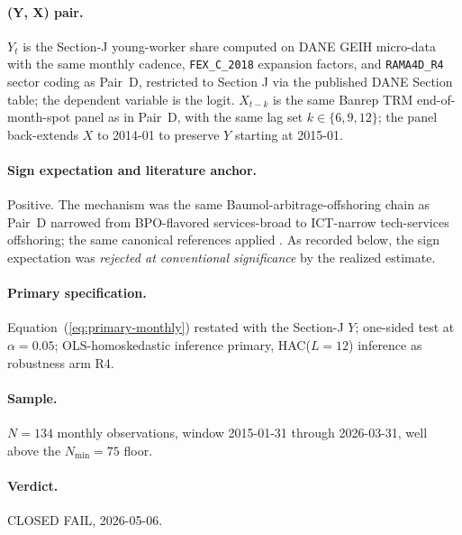 \paragraph{(Y, X) pair.} \(Y_t\) is the Section-J young-worker share
computed on DANE GEIH micro-data with the same monthly cadence,
\texttt{FEX\_C\_2018} expansion factors, and \texttt{RAMA4D\_R4}
sector coding as Pair~D, restricted to Section J via the published
DANE Section table; the dependent variable is the logit. \(X_{t-k}\)
is the same Banrep TRM end-of-month-spot panel as in Pair~D, with the
same lag set \(k \in \{6, 9, 12\}\); the panel back-extends \(X\) to
2014-01 to preserve \(Y\) starting at 2015-01.

\paragraph{Sign expectation and literature anchor.} Positive. The
mechanism was the same Baumol-arbitrage-offshoring chain as Pair~D
narrowed from BPO-flavored services-broad to ICT-narrow
tech-services offshoring; the same canonical references applied
\citep{mendietamunoz2017, beerepoothendriks2013, errighibodwell2017,
rodrik2016}. As recorded below, the sign expectation was
\emph{rejected at conventional significance} by the realized estimate.

\paragraph{Primary specification.} Equation~(\ref{eq:primary-monthly})
restated with the Section-J \(Y\); one-sided test at \(\alpha = 0.05\);
OLS-homoskedastic inference primary, HAC(\(L = 12\)) inference as
robustness arm R4.

\paragraph{Sample.} \(N = 134\) monthly observations, window
2015-01-31 through 2026-03-31, well above the \(N_{\min} = 75\) floor.

\paragraph{Verdict.} CLOSED FAIL, 2026-05-06.


